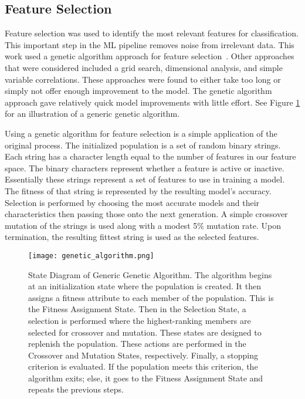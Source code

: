 \subsection{Feature Selection}
Feature selection was used to identify the most relevant features for classification.
This important step in the \ac{ML} pipeline removes noise from irrelevant data.
This work used a genetic algorithm approach for feature selection~\cite{yang1998feature}.
Other approaches that were considered included a grid search, dimensional analysis, and simple variable correlations.
These approaches were found to either take too long or simply not offer enough improvement to the model.
The genetic algorithm approach gave relatively quick model improvements with little effort.
See Figure \ref{fig:genetic} for an illustration of a generic genetic algorithm.

\par
Using a genetic algorithm for feature selection is a simple application of the original process.
The initialized population is a set of random binary strings.
Each string has a character length equal to the number of features in our feature space.
The binary characters represent whether a feature is active or inactive.
Essentially these strings represent a set of features to use in training a model.
The fitness of that string is represented by the resulting model's accuracy.
Selection is performed by choosing the most accurate models and their characteristics then passing those onto the next generation.
A simple crossover mutation of the strings is used along with a modest 5\% mutation rate.
Upon termination, the resulting fittest string is used as the selected features.


\begin{figure}[htp]
    \centering
    \texttt{[image: genetic\_algorithm.png]}
    \caption{State Diagram of Generic Genetic Algorithm.
    The algorithm begins at an initialization state where the population is created.
    It then assigns a fitness attribute to each member of the population.
    This is the Fitness Assignment State.
    Then in the Selection State, a selection is performed where the highest-ranking members are selected for crossover and mutation.
    These states are designed to replenish the population.
    These actions are performed in the Crossover and Mutation States, respectively.
    Finally, a stopping criterion is evaluated.
    If the population meets this criterion, the algorithm exits; else, it goes to the Fitness Assignment State and repeats the previous steps.}
    \label{fig:genetic}
\end{figure}

